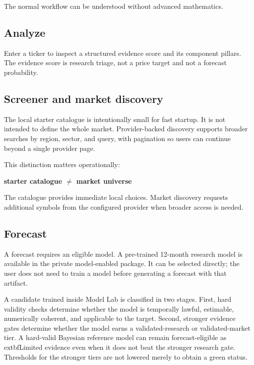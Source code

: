 \documentclass[11pt]{article}
\begin{document}
The normal workflow can be understood without advanced mathematics.

\subsection{Analyze}

Enter a ticker to inspect a structured evidence score and its component pillars. The evidence score is research triage, not a price target and not a forecast probability.

\subsection{Screener and market discovery}

The local starter catalogue is intentionally small for fast startup. It is not intended to define the whole market. Provider-backed discovery supports broader searches by region, sector, and query, with pagination so users can continue beyond a single provider page.

This distinction matters operationally:

\begin{center}
\textbf{starter catalogue $\neq$ market universe}
\end{center}

The catalogue provides immediate local choices. Market discovery requests additional symbols from the configured provider when broader access is needed.

\subsection{Forecast}

A forecast requires an eligible model. A pre-trained 12-month research model is available in the private model-enabled package. It can be selected directly; the user does not need to train a model before generating a forecast with that artifact.

A candidate trained inside Model Lab is classified in two stages. First, hard validity checks determine whether the model is temporally lawful, estimable, numerically coherent, and applicable to the target. Second, stronger evidence gates determine whether the model earns a validated-research or validated-market tier. A hard-valid Bayesian reference model can remain forecast-eligible as 	extbf{Limited evidence} even when it does not beat the stronger research gate. Thresholds for the stronger tiers are not lowered merely to obtain a green status.
\end{document}

